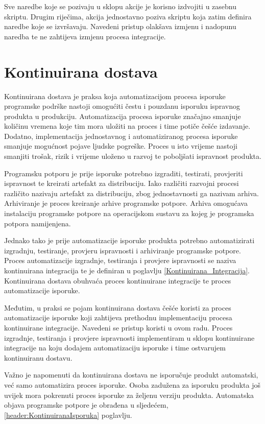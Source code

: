 \documentclass[times, utf8, diplomski, numeric]{fer}
\begin{document}
Sve naredbe koje se pozivaju u sklopu akcije je korisno izdvojiti u zasebnu skriptu. Drugim riječima, akcija jednostavno poziva skriptu koja zatim definira naredbe koje se izvršavaju. Navedeni pristup olakšava izmjenu i nadopunu naredba te ne zahtijeva izmjenu procesa integracije.





\chapter{Kontinuirana dostava}

Kontinuirana dostava je praksa koja automatizacijom procesa isporuke programske podrške nastoji omogućiti čestu i pouzdanu isporuku ispravnog produkta u produkciju. Automatizacija procesa isporuke značajno smanjuje količinu vremena koje tim mora uložiti na proces i time potiče češće izdavanje. Dodatno, implementacija jednostavnog i automatiziranog procesa isporuke smanjuje mogućnost pojave ljudske pogreške. Proces u isto vrijeme nastoji smanjiti trošak, rizik i vrijeme uloženo u razvoj te poboljšati ispravnost produkta\citep{wiki:ContinuousDelivery}.

Programsku potporu je prije isporuke potrebno izgraditi, testirati, provjeriti ispravnost te kreirati artefakt za distribuciju. Iako različiti razvojni procesi različito nazivaju artefakt za distribuciju, zbog jednostavnosti ga nazivam arhiva. Arhiviranje je proces kreiranje arhive programske potpore. Arhiva omogućava instalaciju programske potpore na operacijskom sustavu za kojeg je programska potpora namijenjena.

Jednako tako je prije automatizacije isporuke produkta potrebno automatizirati izgradnju, testiranje, provjeru ispravnosti i arhiviranje programske potpore. Proces automatizacije izgradnje, testiranja i provjere ispravnosti se naziva kontinuirana integracija te je definiran u poglavlju \ref{Kontinuirana_Integracija}. Kontinuirana dostava obuhvaća proces kontinuirane integracije te proces automatizacije isporuke.

Međutim, u praksi se pojam kontinuirana dostava češće koristi za proces automatizacije isporuke koji zahtijeva prethodnu implementaciju procesa kontinuirane integracije. Navedeni se pristup koristi u ovom radu. Proces izgradnje, testiranja i provjere ispravnosti implementiram u sklopu kontinuirane integracije na koju dodajem automatizaciju isporuke i time ostvarujem kontinuiranu dostavu.

Važno je napomenuti da kontinuirana dostava ne isporučuje produkt automatski, već samo automatizira proces isporuke. Osoba zadužena za isporuku produkta još uvijek mora pokrenuti proces isporuke za željenu verziju produkta. Automatska objava programske potpore je obrađena u sljedećem, \ref{header:KontinuiranaIsporuka} poglavlju.
\end{document}
